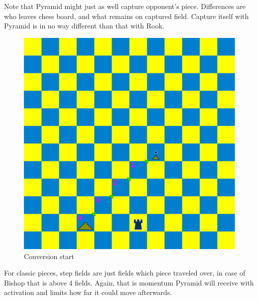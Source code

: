 \documentclass[a5paper,12pt,draft]{book} %
\begin{document}
Note that Pyramid might just as well capture opponent's piece. Differences are
who leaves chess board, and what remains on captured field. Capture itself with
Pyramid is in no way different than that with Rook.

\clearpage

\noindent
\begin{figure}[!h]
\includegraphics[width=1.0\textwidth, keepaspectratio=true]{../gfx/examples/07_move_pyramid_conversion_init.png}
\caption{Conversion start}
\label{fig:ma_conversion_init}
\end{figure}

For classic pieces, step fields are just fields which piece traveled over,
in case of Bishop that is above 4 fields. Again, that is momentum Pyramid
will receive with activation and limits how far it could move afterwards.

\clearpage
\end{document}
